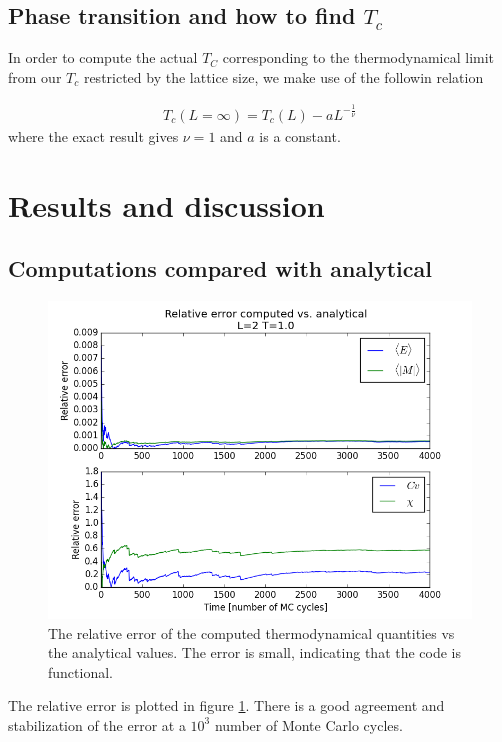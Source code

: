 \documentclass[norsk, 10pt, twocolumn, a4paper]{revtex4}
\begin{document}
\subsection{Phase transition and how to find $T_c$}
In order to compute the actual $T_C$ corresponding to the thermodynamical limit from our $T_c$ restricted by the lattice size, we
make use of the followin relation

\begin{align}
    T_c(L=\infty) = T_c(L) - aL^{-\frac{1}{\nu}}
\end{align}
where the exact result gives $\nu=1$ and $a$ is a constant. 

\section{Results and discussion}
\subsection{Computations compared with analytical}
\begin{figure}
    \includegraphics[width=0.9\linewidth]{error.png}
    \caption{
        \label{fig:b1}
        The relative error of the computed thermodynamical quantities vs the analytical values.
    The error is small, indicating that the code is functional.}
\end{figure}
The relative error is plotted in figure \ref{fig:b1}. There is a good agreement and
stabilization of the error at a $10^3$ number of Monte Carlo cycles.
\end{document}
